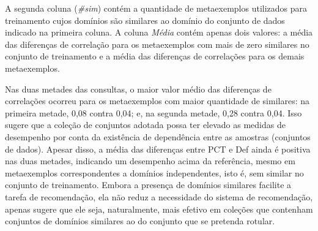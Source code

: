 A segunda coluna (\textit{\#sim}) contém a quantidade de metaexemplos utilizados para treinamento cujos domínios são similares ao domínio do conjunto de dados indicado na primeira coluna.
A coluna \textit{Média} contém apenas dois valores: a média das diferenças de correlação para os metaexemplos com mais de zero similares no conjunto de treinamento e a média das diferenças de correlações para os demais metaexemplos.

Nas duas metades das consultas, o maior valor médio das diferenças de correlações ocorreu para os metaexemplos com maior quantidade de similares: na primeira metade, 0,08 contra 0,04; e, na segunda metade, 0,28 contra 0,04.
Isso sugere que a coleção de conjuntos adotada possa ter elevado as medidas de desempenho por conta da existência de dependência entre as amostras (conjuntos de dados).
Apesar disso, a média das diferenças entre PCT e Def ainda é positiva nas duas metades, indicando um desempenho acima da referência, mesmo em metaexemplos correspondentes a domínios independentes, isto é, sem similar no conjunto de treinamento.
Embora a presença de domínios similares facilite a tarefa de recomendação, ela não reduz a necessidade do sistema de recomendação, apenas sugere que ele seja, naturalmente, mais efetivo em coleções que contenham conjuntos de domínios similares ao do conjunto que se pretenda rotular.
